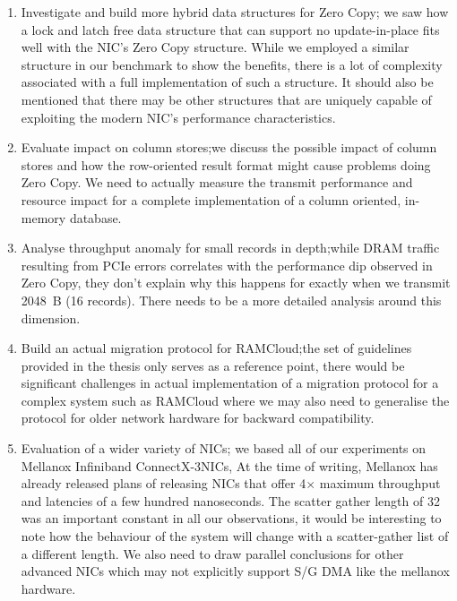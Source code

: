\begin{enumerate}
\item Investigate and build more hybrid data structures for Zero Copy; we saw how a lock and latch free data structure that can support no update-in-place 
fits well with the NIC's Zero Copy structure. While we employed a similar structure in our benchmark to show the benefits, there is a lot of complexity associated 
with a full implementation of such a structure. It should also be mentioned that there may be other structures that are uniquely capable of exploiting the modern NIC's 
performance characteristics.
\item Evaluate impact on column stores;we discuss the possible impact of column stores and how the row-oriented result format might cause problems doing Zero Copy. We need 
to actually measure the transmit performance and resource impact for a complete implementation of a column oriented, in-memory database.
\item Analyse throughput anomaly for small records in depth;while DRAM traffic resulting from PCIe errors correlates with the performance dip observed in Zero Copy, 
they don't explain why this happens for exactly when we transmit 2048~B (16 records). There needs to be a more detailed analysis around this dimension.
\item Build an actual migration protocol for RAMCloud;the set of guidelines provided in the thesis only serves as a reference point, there would be significant challenges 
in actual implementation of a migration protocol for a complex system such as RAMCloud where we may also need to generalise the protocol for older network hardware for backward 
compatibility.
\item Evaluation of a wider variety of NICs; we based all of our experiments on Mellanox Infiniband ConnectX-3\textregistered NICs, At the time of writing, Mellanox has already 
released plans of releasing NICs that offer 4$\times$ maximum throughput and latencies of a few hundred nanoseconds. The scatter gather length of 32 was an important constant in 
all our observations, it would be interesting to note how the behaviour of the system will change with a scatter-gather list of a different length. We also need to draw parallel 
conclusions for other advanced NICs which may not explicitly support S/G DMA like the mellanox hardware.
\end{enumerate}